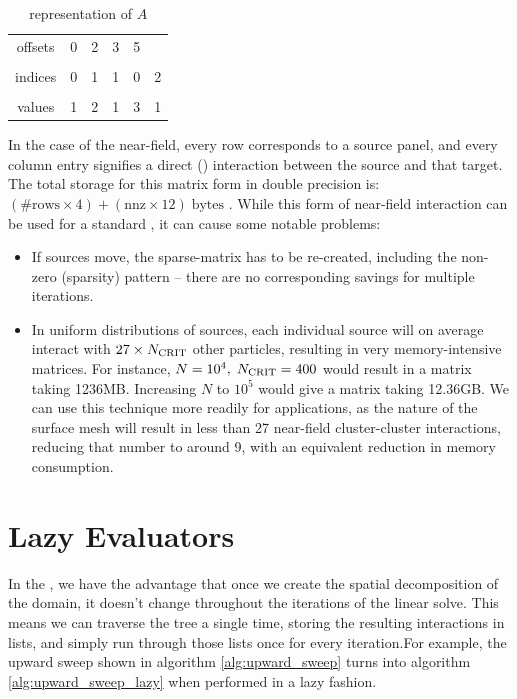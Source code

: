 \begin{table}[h]
\begin{center}
\begin{tabular}{c|ccccc}
	offsets & 0 & 2 & 3 & 5 & \\
	 & & & & & \\
	indices & 0 & 1 & 1 & 0 & 2 \\
	 & & & & & \\
	values & 1 & 2 & 1 & 3 & 1
\end{tabular}
\end{center}
\caption{{\csr} representation of $A$}
\end{table}%

In the case of the near-field, every row corresponds to a source panel, and every column entry signifies a direct (\ptop) interaction between the source and that target. The total storage for this matrix form in double precision is: $(\# \text{rows} \times 4) + (\text{nnz} \times 12)\;\text{bytes}$ . While this form of near-field interaction can be used for a standard {\fmm}, it can cause some notable problems:

\begin{itemize}
\item If sources move, the sparse-matrix has to be re-created, including the non-zero (sparsity) pattern -- there are no corresponding savings for multiple iterations.
\item In uniform distributions of sources, each individual source will on average interact with  $27\times N_{\text{CRIT}}$ other particles, resulting in very memory-intensive matrices. For instance, $N = 10^{4},\;N_{\text{CRIT}}=400$ would result in a matrix taking 1236MB. Increasing $N$ to $10^{5}$ would give a matrix taking 12.36GB. We can use this technique more readily for {\bem} applications, as the nature of the surface mesh will result in less than 27 near-field cluster-cluster interactions, reducing that number to around 9, with an equivalent reduction in memory consumption.
\end{itemize}

\section{Lazy Evaluators}\label{sec:fmm_lazy_eval}

In the {\fmmbem}, we have the advantage that once we create the spatial decomposition of the domain, it doesn't change throughout the iterations of the linear solve. This means we can traverse the tree a single time, storing the resulting interactions in lists, and simply run through those lists once for every iteration.For example, the upward sweep shown in algorithm \ref{alg:upward_sweep} turns into algorithm \ref{alg:upward_sweep_lazy} when performed in a lazy fashion.

